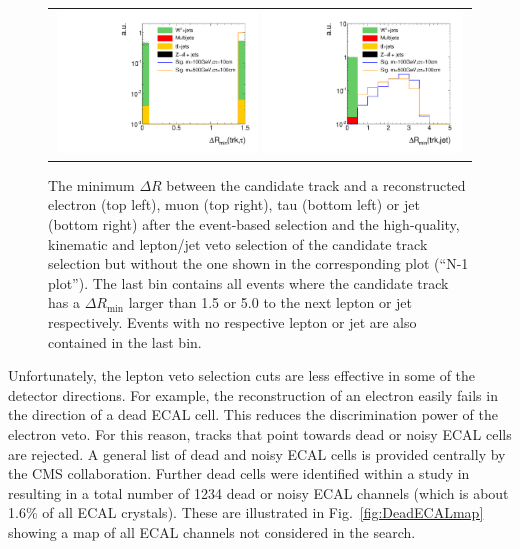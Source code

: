 \begin{figure}[!b]
\begin{tabular}{c}
    \includegraphics[width=0.49\textwidth]{figures/analysis_2/AnalysisSelection/htrackdRminTau_log.pdf}
    \includegraphics[width=0.49\textwidth]{figures/analysis_2/AnalysisSelection/htrackdRminJet_log.pdf}
  \end{tabular}
  \caption{The minimum $\Delta R$ between the candidate track and a reconstructed electron (top left), muon (top right), tau (bottom left) or jet (bottom right) 
           after the event-based selection and the high-quality, kinematic and lepton/jet veto selection of the candidate track selection but without the one shown in the corresponding plot (``N-1 plot''). 
           The last bin contains all events where the candidate track has a $\Delta R_{\text{min}}$ larger than 1.5 or 5.0 to the next lepton or jet respectively. 
           Events with no respective lepton or jet are also contained in the last bin.}
  \label{fig:TrackdRmin}
\end{figure}

Unfortunately, the lepton veto selection cuts are less effective in some of the detector directions.
For example, the reconstruction of an electron easily fails in the direction of a dead ECAL cell.
This reduces the discrimination power of the electron veto.
For this reason, tracks that point towards dead or noisy ECAL cells are rejected.
A general list of dead and noisy ECAL cells is provided centrally by the CMS collaboration.
Further dead cells were identified within a study in~\cite{bib:CMS:DT_Thesis,bib:CMS:DT_8TeV_AN} resulting in a total number of 1234 dead or noisy ECAL channels (which is about 1.6\% of all ECAL crystals). 
These are illustrated in Fig.~\ref{fig:DeadECALmap} showing a map of all ECAL channels not considered in the search.



